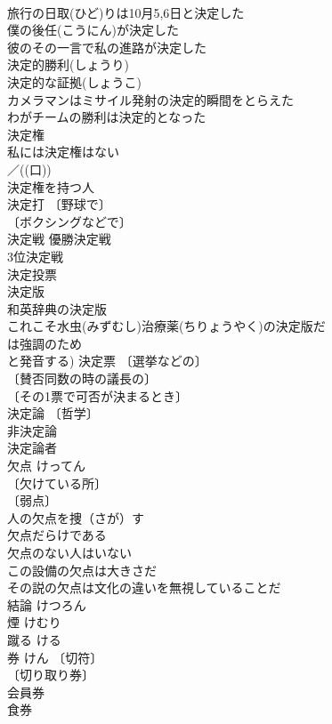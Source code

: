 \documentclass[8pt]{extreport}
\begin{document}
\begin{CJK}{UTF8}{min}
\\	旅行の日取(ひど)りは10月5,6日と決定した 
\\	僕の後任(こうにん)が決定した 
\\	彼のその一言で私の進路が決定した 
\\	決定的勝利(しょうり) 
\\	決定的な証拠(しょうこ) 
\\	カメラマンはミサイル発射の決定的瞬間をとらえた 
\\	わがチームの勝利は決定的となった 
\\	決定権 
\\	私には決定権はない 
\\	／((口)) 
\\	決定権を持つ人 
\\	決定打 〔野球で〕
\\	〔ボクシングなどで〕
\\	決定戦 優勝決定戦 
\\	3位決定戦 
\\	決定投票 
\\	決定版 
\\	和英辞典の決定版 
\\	これこそ水虫(みずむし)治療薬(ちりょうやく)の決定版だ 
\\	は強調のため
\\	と発音する) 決定票 〔選挙などの〕
\\	〔賛否同数の時の議長の〕
\\	〔その1票で可否が決まるとき〕
\\	決定論 〔哲学〕
\\	非決定論 
\\	決定論者 
\\	欠点	けってん	
\\	〔欠けている所〕
\\	〔弱点〕
\\	人の欠点を捜（さが）す 
\\	欠点だらけである 
\\	欠点のない人はいない 
\\	この設備の欠点は大きさだ 
\\	その説の欠点は文化の違いを無視していることだ 
\\	結論	けつろん	
\\	煙	けむり	
\\	蹴る	ける	
\\	券	けん	〔切符〕
\\	〔切り取り券〕
\\	会員券 
\\	食券 

\end{CJK}
\end{document}
